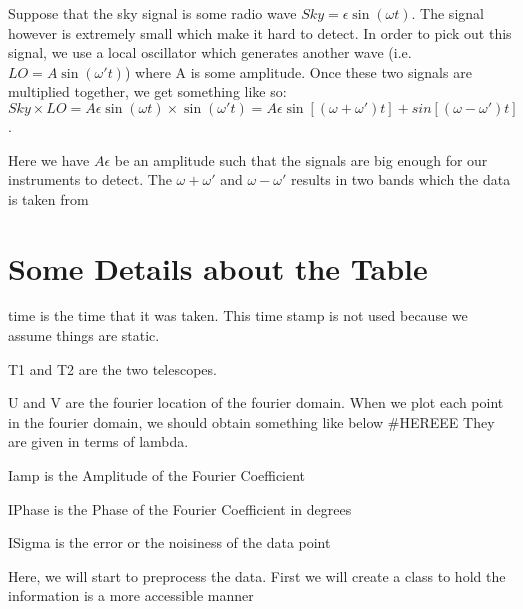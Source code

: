 \documentclass[letterpaper,10pt,english]{jupyterBook}
\begin{document}
\sphinxAtStartPar
Suppose that the sky signal is some radio wave \(Sky = \epsilon \sin(\omega t)\). The signal however is extremely small which make it hard to detect. In order to pick out this signal, we use a local oscillator which generates another wave (i.e. \(LO = A \sin(\omega't)\)) where A is some amplitude. Once these two signals are multiplied together, we get something like so: \(Sky \times LO = A \epsilon \sin(\omega t) \times \sin(\omega' t) = A \epsilon {\sin[(\omega + \omega')t] + sin [(\omega - \omega')t]}\).

\sphinxAtStartPar
Here we have \(A \epsilon\) be an amplitude such that the signals are big enough for our instruments to detect.
The \(\omega + \omega'\) and \(\omega - \omega'\) results in two bands which the data is taken from


\section{Some Details about the Table}
\label{\detokenize{data:some-details-about-the-table}}
\sphinxAtStartPar
time is the time that it was taken. This time stamp is not used because we assume things are static.

\sphinxAtStartPar
T1 and T2 are the two telescopes.

\sphinxAtStartPar
U and V are the fourier location of the fourier domain. When we plot each point in the fourier domain, we should obtain something like below \#HEREEE They are given in terms of lambda.

\sphinxAtStartPar
Iamp is the Amplitude of the Fourier Coefficient

\sphinxAtStartPar
IPhase is the Phase of the Fourier Coefficient in degrees

\sphinxAtStartPar
ISigma is the error or the noisiness of the data point

\sphinxAtStartPar
Here, we will start to preprocess the data. First we will create a class to hold the information is a more accessible manner
\end{document}
